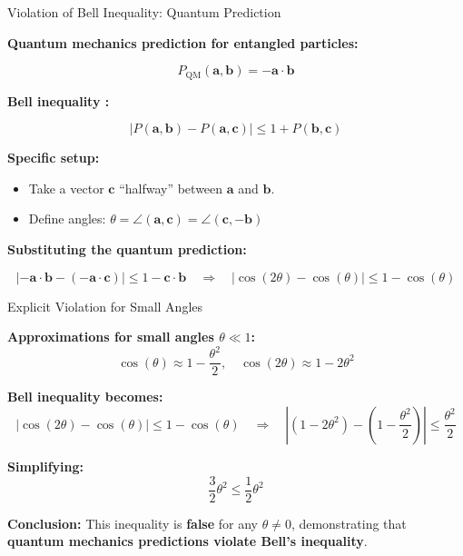 \begin{frame}{Violation of Bell Inequality: Quantum Prediction}

\textbf{Quantum mechanics prediction for entangled particles:}

\vspace{-0.3cm}

\[
P_\text{QM}(\mathbf{a}, \mathbf{b}) = - \mathbf{a} \cdot \mathbf{b}
\]
\vspace{-0.3cm}

\pause

\textbf{Bell inequality :}

\vspace{-0.3cm}

\[
|P(\mathbf{a},\mathbf{b}) - P(\mathbf{a},\mathbf{c})| \le 1 + P(\mathbf{b},\mathbf{c})
\]

\vspace{-0.3cm}

\pause

\textbf{Specific setup:}  
\begin{itemize}
  \item Take a vector $\mathbf{c}$ “halfway” between $\mathbf{a}$ and $\mathbf{b}$.  
  \item Define angles: 
  \(\theta = \angle(\mathbf{a},\mathbf{c}) = \angle(\mathbf{c},-\mathbf{b})\)
\end{itemize}

\pause

\textbf{Substituting the quantum prediction:}

\vspace{-0.3cm}

\[
|- \mathbf{a} \cdot \mathbf{b} - (- \mathbf{a} \cdot \mathbf{c})| 
\le 1 - \mathbf{c} \cdot \mathbf{b} 
\quad \Rightarrow \quad 
|\cos(2\theta) - \cos(\theta)| \le 1 - \cos(\theta)
\]

\end{frame}



\begin{frame}{Explicit Violation for Small Angles}

\textbf{Approximations for small angles $\theta \ll 1$:}
\[
\cos(\theta) \approx 1 - \frac{\theta^2}{2}, \quad 
\cos(2\theta) \approx 1 - 2\theta^2
\]

\pause

\textbf{Bell inequality becomes:}
\[
| \cos(2\theta) - \cos(\theta) | \le 1 - \cos(\theta)
\quad \Rightarrow \quad
|(1 - 2\theta^2) - (1 - \frac{\theta^2}{2})| \le \frac{\theta^2}{2}
\]

\pause

\textbf{Simplifying:}
\[
\frac{3}{2}\theta^2 \le \frac{1}{2} \theta^2
\]

\pause

\textbf{Conclusion:}  
This inequality is \textbf{false} for any $\theta \neq 0$, demonstrating that 
\textbf{quantum mechanics predictions violate Bell’s inequality}.  

\end{frame}



